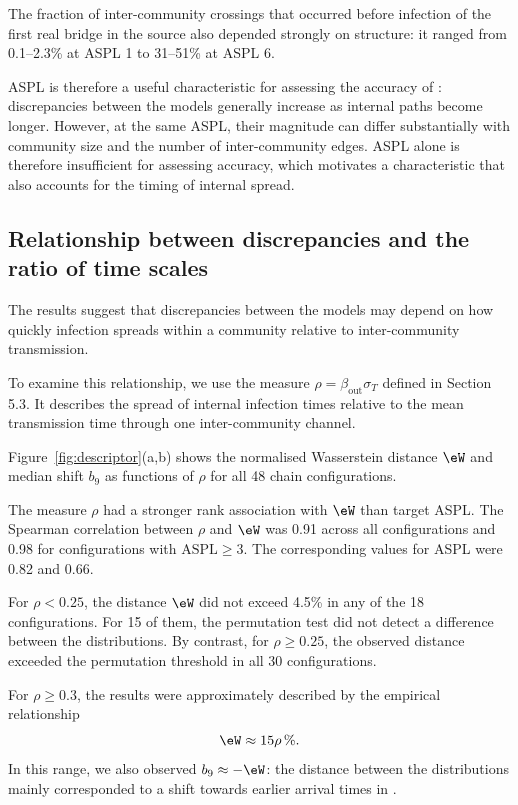 The fraction of \TS{} inter-community crossings that occurred before infection of the first real bridge in the source also depended strongly on structure: it ranged from 0.1--2.3\% at ASPL 1 to 31--51\% at ASPL 6.

ASPL is therefore a useful characteristic for assessing the accuracy of \TS{}: discrepancies between the models generally increase as internal paths become longer. However, at the same ASPL, their magnitude can differ substantially with community size and the number of inter-community edges. ASPL alone is therefore insufficient for assessing accuracy, which motivates a characteristic that also accounts for the timing of internal spread.


\subsection{Relationship between discrepancies and the ratio of time scales}
\label{sec:res_descriptor}

The results suggest that discrepancies between the models may depend on how quickly infection spreads within a community relative to inter-community transmission.

To examine this relationship, we use the measure $\rho=\beta_{\mathrm{out}}\sigma_T$ defined in Section 5.3. It describes the spread of internal infection times relative to the mean transmission time through one inter-community channel.

Figure~\ref{fig:descriptor}(a,b) shows the normalised Wasserstein distance $\eW$ and median shift $b_9$ as functions of $\rho$ for all 48 chain configurations.

The measure $\rho$ had a stronger rank association with $\eW$ than target ASPL. The Spearman correlation between $\rho$ and $\eW$ was 0.91 across all configurations and 0.98 for configurations with $\mathrm{ASPL}\geq3$. The corresponding values for ASPL were 0.82 and 0.66.

For $\rho<0.25$, the distance $\eW$ did not exceed 4.5\% in any of the 18 configurations. For 15 of them, the permutation test did not detect a difference between the distributions. By contrast, for $\rho\geq0.25$, the observed distance exceeded the permutation threshold in all 30 configurations.

For $\rho\geq0.3$, the results were approximately described by the empirical relationship
\begin{equation}
\eW \approx 15\rho\,\%.
\end{equation}
In this range, we also observed $b_9\approx-\eW$: the distance between the distributions mainly corresponded to a shift towards earlier arrival times in \TS{}.

